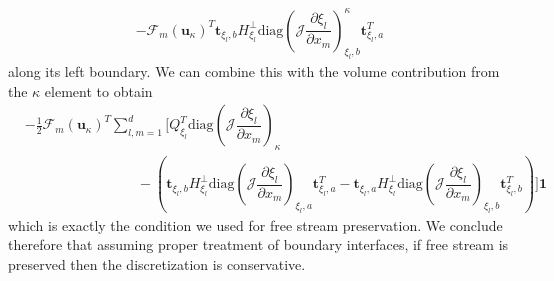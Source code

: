 \documentclass[12pt,a4paper]{article}
\newcommand{\pder}[2][]{\dfrac{\partial #1}{\partial #2}} %
\newcommand{\fn}[1]{\mathcal{#1}} %
\newcommand{\fnb}[1]{\bm{\mathcal{#1}}} %
\begin{document}
\begin{align*}
- \fnb{F}_m ( \bm{u}_\kappa )^T \bm{t}_{\xi_l,b} H^{\bot}_{\xi_l} \text{diag} \left( \fn{J} \pder[\xi_l]{x_m} \right)_{\xi_l,b}^\kappa  \bm{t}_{\xi_l,a}^T   
\end{align*}
along its left boundary. We can combine this with the volume contribution from the $\kappa$ element to obtain
\begin{align*}
 &- \frac{1}{2}  \fnb{F}_m \left( \bm{u}_\kappa \right) ^T \sum_{l,m=1}^d \Bigg[ Q_{\xi_l}^T \text{diag} \left( \fn{J} \pder[\xi_l]{x_m} \right)_\kappa  \\
& \qquad \qquad \qquad \qquad - \left(  \bm{t}_{\xi_l,b} H^{\bot}_{\xi_l} \text{diag} \left( \fn{J} \pder[\xi_l]{x_m} \right)_{\xi_l,a}  \bm{t}_{\xi_l,a}^T   -
 \bm{t}_{\xi_l,a}  H^{\bot}_{\xi_l} \text{diag} \left( \fn{J} \pder[\xi_l]{x_m} \right)_{\xi_l,b} \bm{t}_{\xi_l,b}^T
  \right) \Bigg] \bm{1}
\end{align*}
which is exactly the condition we used for free stream preservation. We conclude therefore that assuming proper treatment of boundary interfaces, if free stream is preserved then the discretization is conservative.


\newpage


\end{document}
